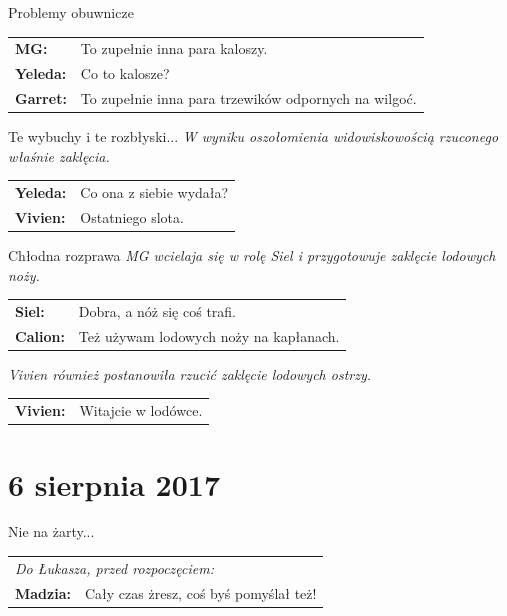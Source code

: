 \documentclass[10pt,twoside,twocolumn]{book}
\begin{document}
\begin{rpg-quotebox}{Problemy obuwnicze}
   \begin{tabularx}{\columnwidth}{lX}
      \textbf{MG:} & To zupełnie inna para kaloszy. \\
      \textbf{Yeleda:} & Co to kalosze? \\
      \textbf{Garret:} & To zupełnie inna para trzewików odpornych na wilgoć.
   \end{tabularx}
\end{rpg-quotebox}


\begin{rpg-quotebox}{Te wybuchy i te rozbłyski...}
   \textit{W wyniku oszołomienia widowiskowością rzuconego właśnie zaklęcia.} \\

   \begin{tabularx}{\columnwidth}{lX}
      \textbf{Yeleda:} & Co ona z siebie wydała? \\
      \textbf{Vivien:} & Ostatniego slota.
   \end{tabularx}
\end{rpg-quotebox}


\begin{rpg-quotebox}{Chłodna rozprawa}
   \textit{MG wcielaja się w rolę Siel i przygotowuje zaklęcie lodowych noży.} \\

   \begin{tabularx}{\columnwidth}{lX}
      \textbf{Siel:} & Dobra, a nóż się coś trafi.\\
      \textbf{Calion:} & Też używam lodowych noży na kapłanach.\\
   \end{tabularx}
   \newline

   \textit{Vivien również postanowiła rzucić zaklęcie lodowych ostrzy.}\\

   \begin{tabularx}{\columnwidth}{lX}
      \textbf{Vivien:} & Witajcie w lodówce.\\
   \end{tabularx}
\end{rpg-quotebox}

\section*{6 sierpnia 2017}

\begin{rpg-quotebox}{Nie na żarty...}
   \begin{tabularx}{\columnwidth}{lX}
      \multicolumn{2}{l}{\textit{Do Łukasza, przed rozpoczęciem:}}\\
      \textbf{Madzia:} & Cały czas żresz, coś byś pomyślał też!\\
   \end{tabularx}
\end{rpg-quotebox}
\end{document}
